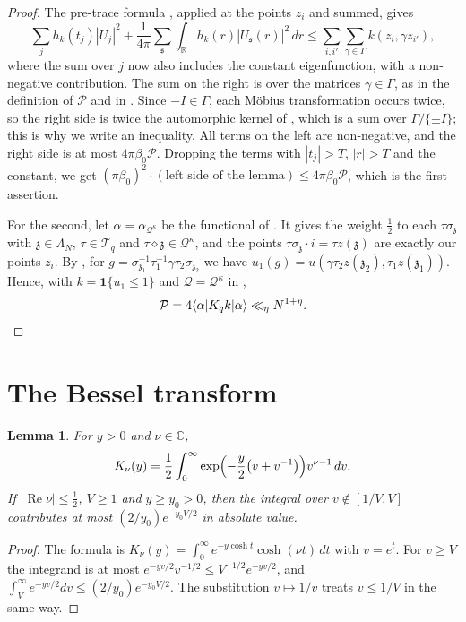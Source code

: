 \documentclass[11pt]{amsart}
\newtheorem{lemma}[theorem]{Lemma}
\theoremstyle{remark}
\theoremstyle{definition}
\numberwithin{equation}{section}
\newcommand{\Qc}{\mathcal{Q}}
\newcommand{\Tc}{\mathcal{T}}
\newcommand{\Pc}{\mathcal{P}}
\newcommand{\R}{\mathbb{R}}
\newcommand{\C}{\mathbb{C}}
\newcommand{\gz}{\mathfrak{z}}
\newcommand{\gs}{\mathfrak{s}}
\newcommand{\one}{\mathbf{1}}
\newcommand{\br}[1]{\langle #1\rangle}
\begin{document}
\begin{proof}
The pre-trace formula \cite[Theorem~7.4]{Iw}, applied at the points $z_i$ and summed, gives
\[
\sum_jh_k(t_j)|U_j|^2+\frac1{4\pi}\sum_\gs\int_\R h_k(r)|U_\gs(r)|^2\,dr\le\sum_{i,i'}\sum_{\gamma\in\Gamma}k(z_i,\gamma z_{i'}),
\]
where the sum over $j$ now also includes the constant eigenfunction, with a non-negative contribution. The sum on the right is over the matrices $\gamma\in\Gamma$, as in the definition of $\Pc$ and in \cite{II}. Since $-I\in\Gamma$, each M\"obius transformation occurs twice, so the right side is twice the automorphic kernel of \cite[Theorem~7.4]{Iw}, which is a sum over $\Gamma/\{\pm I\}$; this is why we write an inequality. All terms on the left are non-negative, and the right side is at most $4\pi\beta_0\Pc$. Dropping the terms with $|t_j|>T$, $|r|>T$ and the constant, we get $(\pi \beta_0)^2\cdot(\text{left side of the lemma})\le4\pi \beta_0\Pc$, which is the first assertion.

For the second, let $\alpha=\alpha_{\Qc^\kappa}$ be the functional of \cite[Lemma~6.2(b)]{II}. It gives the weight $\frac12$ to each $\tau\sigma_\gz$ with $\gz\in\Lambda_N$, $\tau\in\Tc_q$ and $\tau\diamond\gz\in\Qc^\kappa$, and the points $\tau\sigma_\gz\cdot i=\tau z(\gz)$ are exactly our points $z_i$. By \cite[(6.1), (6.2)]{II}, for $g=\sigma_{\gz_1}^{-1}\tau_1^{-1}\gamma\tau_2\sigma_{\gz_2}$ we have $u_1(g)=u(\gamma\tau_2z(\gz_2),\tau_1z(\gz_1))$. Hence, with $k=\one\{u_1\le1\}$ and $\Qc=\Qc^\kappa$ in \cite[Lemma~6.4]{II},
\[
\Pc=4\br{\alpha|K_qk|\alpha}\ll_\eta N^{1+\eta}.\qedhere
\]
\end{proof}

\section{The Bessel transform}\label{sec:bessel}

\begin{lemma}\label{lem:vrep}
For $y>0$ and $\nu\in\C$,
\[
K_\nu(y)=\frac12\int_0^\infty\exp\Bigl(-\frac y2\bigl(v+v^{-1}\bigr)\Bigr)v^{\nu-1}\,dv.
\]
If $|\operatorname{Re}\nu|\le\frac12$, $V\ge1$ and $y\ge y_0>0$, then the integral over $v\notin[1/V,V]$ contributes at most $(2/y_0)e^{-y_0V/2}$ in absolute value.
\end{lemma}

\begin{proof}
The formula is $K_\nu(y)=\int_0^\infty e^{-y\cosh t}\cosh(\nu t)\,dt$ \cite[\S6.22]{Wat} with $v=e^t$. For $v\ge V$ the integrand is at most $e^{-yv/2}v^{-1/2}\le V^{-1/2}e^{-yv/2}$, and $\int_V^\infty e^{-yv/2}dv\le(2/y_0)e^{-y_0V/2}$. The substitution $v\mapsto1/v$ treats $v\le1/V$ in the same way.
\end{proof}
\end{document}
